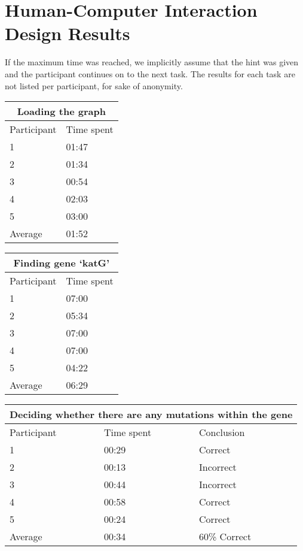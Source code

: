 \chapter{Human-Computer Interaction Design Results}
\label{ch:human-computer-interaction-design-results}

If the maximum time was reached, we implicitly assume that the hint was given and the participant continues on to the next task. The results for each task are not listed per participant, for sake of anonymity.

\begin{center}
	\begin{tabular}{| l | l |}
		\hline
		\multicolumn{2}{|c|}{Loading the graph} \\
		\hline
		Participant & Time spent\\
		\hline
		1 & 01:47\\
		2 & 01:34\\
		3 & 00:54\\
		4 & 02:03\\
		5 & 03:00\\
		\hline
		Average & 01:52\\
		\hline
	\end{tabular}
\end{center}

\begin{center}
	\begin{tabular}{| l | l |}
		\hline
		\multicolumn{2}{|c|}{Finding gene ‘katG’} \\
		\hline
		Participant & Time spent\\
		\hline
		1 & 07:00\\
		2 & 05:34\\
		3 & 07:00\\
		4 & 07:00\\
		5 & 04:22\\
		\hline
		Average & 06:29\\
		\hline
	\end{tabular}
\end{center}

\begin{center}
	\begin{tabular}{| l | l | l |}
		\hline
		\multicolumn{3}{|c|}{Deciding whether there are any mutations within the gene} \\
		\hline
		Participant & Time spent & Conclusion\\
		\hline
		1 & 00:29 & Correct\\
		2 & 00:13 & Incorrect\\
		3 & 00:44 & Incorrect\\
		4 & 00:58 & Correct\\
		5 & 00:24 & Correct\\
		\hline
		Average & 00:34 & 60\% Correct\\
		\hline
	\end{tabular}
\end{center}



